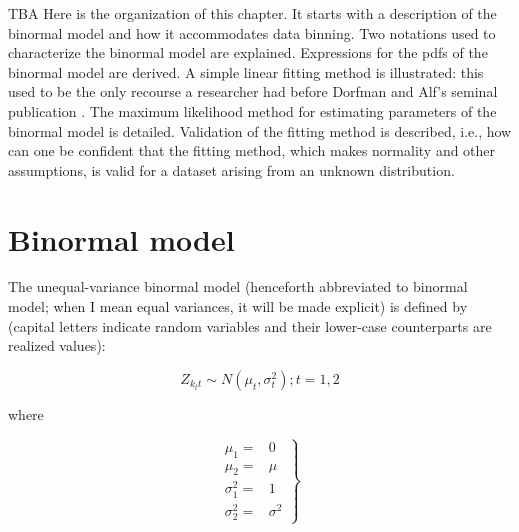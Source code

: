 \documentclass[
]{book}
\begin{document}
TBA Here is the organization of this chapter. It starts with a description of the binormal model and how it accommodates data binning. Two notations used to characterize the binormal model are explained. Expressions for the pdfs of the binormal model are derived. A simple linear fitting method is illustrated: this used to be the only recourse a researcher had before Dorfman and Alf's seminal publication \citep{RN1081}. The maximum likelihood method for estimating parameters of the binormal model is detailed. Validation of the fitting method is described, i.e., how can one be confident that the fitting method, which makes normality and other assumptions, is valid for a dataset arising from an unknown distribution.

\hypertarget{binormal-model-definition}{%
\section{Binormal model}\label{binormal-model-definition}}

The unequal-variance binormal model (henceforth abbreviated to binormal model; when I mean equal variances, it will be made explicit) is defined by (capital letters indicate random variables and their lower-case counterparts are realized values):

\begin{equation} 
Z_{k_tt}\sim N\left ( \mu_t,\sigma_{t}^{2} \right );t=1,2
\label{eq:binormal-model-z-samples-1}
\end{equation}

where

\begin{equation} 
\left.
\begin{aligned}
\mu_1=&0\\
\mu_2=&\mu\\
\sigma_{1}^{2}=&1\\
\sigma_{2}^{2}=&\sigma^{2}
\end{aligned}
\right \}
\label{eq:binormal-model-z-samples-2}
\end{equation}
\end{document}
